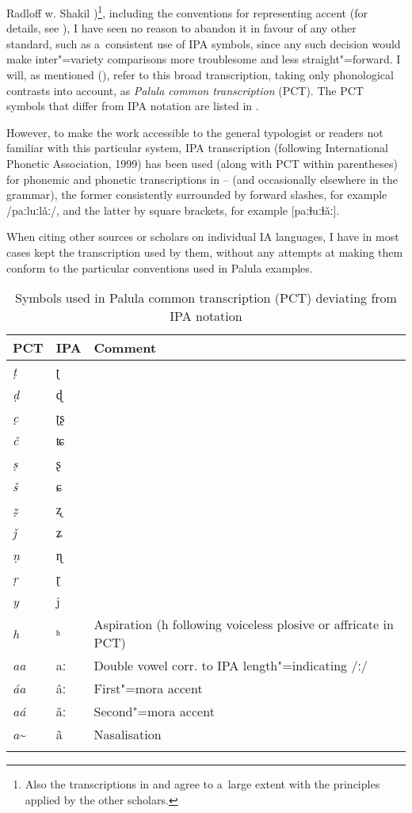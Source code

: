 {Radloff w. Shakil \citeyear{radloffshakil1998})\footnote{Also the transcriptions in
    \citet{hook1990a,hook1996} and \citet{hookzia2005} agree to a~large extent with the principles
    applied by the other scholars.}, including the conventions for representing accent (for details,
  see ), I have seen no reason to abandon it in favour of any other standard, such as
  a~consistent use of IPA symbols, since any such decision would make inter"=variety comparisons more
  troublesome and less straight"=forward. I will, as mentioned (), refer to this broad transcription, taking only phonological contrasts into account, as \textit{Palula common transcription} (PCT). The PCT symbols that differ from IPA notation are listed in .


However, to make the work accessible to the general typologist or readers not familiar with this
particular system, IPA transcription (following International Phonetic Association, 1999) has been
used (along with PCT within parentheses) for phonemic and phonetic
transcriptions in -- (and occasionally elsewhere in the grammar), the former consistently surrounded by forward slashes, for example /paːluːlǎː/, and the latter by square brackets, for example [paːɫuːɫǎː]. 


When citing other sources or scholars on individual IA languages, I have in most cases kept the
transcription used by them, without any attempts at making them conform to the particular
conventions used in Palula examples.


\begin{table}[ht]
\caption{Symbols used in Palula common transcription (PCT) deviating from IPA notation}
\begin{tabularx}{.8\textwidth}{ l l   Q }
\lsptoprule
PCT &
IPA &
Comment\\\midrule
\textit{ṭ} &
ʈ &
\\
\textit{ḍ} &
ɖ &
\\
\textit{c̣} &
ʈʂ &
\\
\textit{č} &
ʨ &
\\
\textit{ṣ} &
ʂ &
\\
\textit{š} &
ɕ &
\\
\textit{ẓ} &
ʐ &
\\
\textit{ǰ} &
ʑ &\\


\textit{ṇ} &
ɳ &
\\
\textit{ṛ} &
ɽ &
\\
\textit{y} &
j &
\\
\textit{h} &
ʰ &
Aspiration (h following voiceless plosive or affricate in PCT)
\\
\textit{aa} &
aː &
Double vowel corr. to IPA length"=indicating /ː/
\\
\textit{áa} &
âː &
First"=mora accent
\\
\textit{aá} &
ǎː &
Second"=mora accent
\\
\textit{a}\textasciitilde &
ã &
Nasalisation\\\lspbottomrule
\end{tabularx}
\label{tab:1-5}
\end{table}

}
